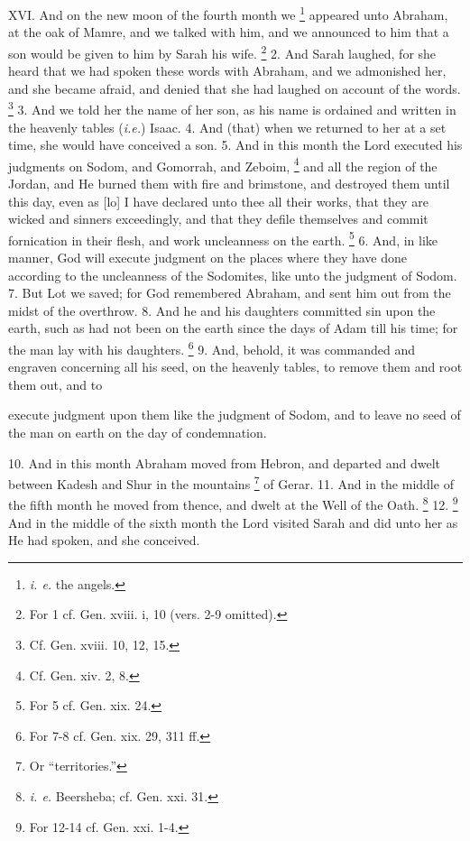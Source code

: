 XVI. And on the new moon of the fourth month we \footnote{\emph{i. e.} the angels.} appeared unto Abraham, at the oak of Mamre, and we talked with him, and we announced to him that a son would be given to him by Sarah his wife. \footnote{For 1 cf. Gen. xviii. i, 10 (vers. 2-9 omitted).} 2. And Sarah laughed, for she heard that we had spoken these words with Abraham, and we admonished her, and she became afraid, and denied that she had laughed on account of the words. \footnote{Cf. Gen. xviii. 10, 12, 15.} 3. And we told her the name of her son, as his name is ordained and written in the heavenly tables (\emph{i.e.}) Isaac. 4. And (that) when we returned to her at a set time, she would have conceived a son. 5. And in this month the Lord executed his judgments on Sodom, and Gomorrah, and Zeboim, \footnote{Cf. Gen. xiv. 2, 8.} and all the region of the Jordan, and He burned them with fire and brimstone, and destroyed them until this day, even as [lo] I have declared unto thee all their works, that they are wicked and sinners exceedingly, and that they defile themselves and commit fornication in their flesh, and work uncleanness on the earth. \footnote{For 5 cf. Gen. xix. 24.} 6. And, in like manner, God will execute judgment on the places where they have done according to the uncleanness of the Sodomites, like unto the judgment of Sodom. 7. But Lot we saved; for God remembered Abraham, and sent him out from the midst of the overthrow. 8. And he and his daughters committed sin upon the earth, such as had not been on the earth since the days of Adam till his time; for the man lay with his daughters. \footnote{For 7-8 cf. Gen. xix. 29, 311 ff.} 9. And, behold, it was commanded and engraven concerning all his seed, on the heavenly tables, to remove them and root them out, and to

execute judgment upon them like the judgment of Sodom, and to leave no seed of the man on earth on the day of condemnation.


10. And in this month Abraham moved from Hebron, and departed and dwelt between Kadesh and Shur in the mountains \footnote{Or ``territories.''} of Gerar. 11. And in the middle of the fifth month he moved from thence, and dwelt at the Well of the Oath. \footnote{\emph{i. e.} Beersheba; cf. Gen. xxi. 31.} 12. \footnote{For 12-14 cf. Gen. xxi. 1-4.} And in the middle of the sixth month the Lord visited Sarah and did unto her as He had spoken, and she conceived.

